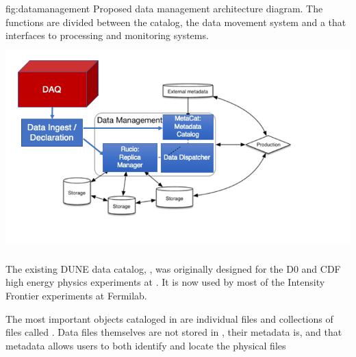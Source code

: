 \documentclass[../main-v1.tex]{subfiles}
\begin{document}
\begin{dunefigure}
{fig:datamanagement} 
{Proposed data management architecture diagram.  The  functions are divided between the  catalog, the  data movement system and a  that interfaces to processing and monitoring systems.  }
\includegraphics[height=8cm]{graphics/DataManagement/data_mgmt_figures.png}
\end{dunefigure}




The existing DUNE data catalog, , was originally designed for the D0 and CDF high energy physics experiments at .  It is now used by most of the Intensity Frontier experiments at Fermilab. %

The most important objects cataloged in  are individual files and collections of files called
.
Data files themselves are not stored in , their metadata is, and that metadata allows users to both identify and locate the physical files %

\end{document}

